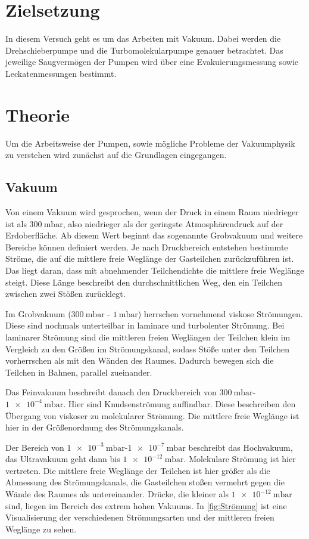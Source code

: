 \section{Zielsetzung}
    In diesem Versuch geht es um das Arbeiten mit Vakuum.
    Dabei werden die Drehschieberpumpe und die Turbomolekularpumpe genauer betrachtet.
    Das jeweilige Saugvermögen der Pumpen wird über eine Evakuierungsmessung sowie Leckatenmessungen bestimmt.

\section{Theorie}
\label{sec:Theorie}
    Um die Arbeitsweise der Pumpen, sowie mögliche Probleme der Vakuumphysik zu verstehen wird zunächst auf die Grundlagen eingegangen.
    \subsection{Vakuum}
        Von einem Vakuum wird gesprochen, wenn der Druck in einem Raum niedrieger ist als $\SI{300}{\milli\bar}$, also niedrieger als der geringste Atmosphärendruck auf der Erdoberfläche.
        Ab diesem Wert beginnt das sogenannte Grobvakuum und weitere Bereiche können definiert werden.
        Je nach Druckbereich entstehen bestimmte Ströme, die auf die mittlere freie Weglänge der Gasteilchen zurückzuführen ist.
        Das liegt daran, dass mit abnehmender Teilchendichte die mittlere freie Weglänge steigt.
        Diese Länge beschreibt den durchschnittlichen Weg, den ein Teilchen zwischen zwei Stößen zurücklegt. 

        \noindent
        Im Grobvakuum ($\SI{300}{\milli\bar}$ - $\SI{1}{\milli\bar}$) herrschen vornehmend viskose Strömungen.
        Diese sind nochmals unterteilbar in laminare und turbolenter Strömung.
        Bei laminarer Strömung sind die mittleren freien Weglängen der Teilchen klein im Vergleich zu den Größen im Strömungskanal, sodass Stöße unter den Teilchen vorherrschen als mit den Wänden des Raumes.
        Dadurch bewegen sich die Teilchen in Bahnen, parallel zueinander.

        \noindent
        Das Feinvakuum beschreibt danach den Druckbereich von $\SI{300}{\milli\bar}$-$\SI{1e-4}{\milli\bar}$.
        Hier sind Knudsenströmung auffindbar.
        Diese beschreiben den Übergang von viskoser zu molekularer Strömung.
        Die mittlere freie Weglänge ist hier in der Größenordnung des Strömungskanals.

        \noindent
        Der Bereich von $\SI{1e-3}{\milli\bar}$-$\SI{1e-7}{\milli\bar}$ beschreibt das Hochvakuum, das Ultravakuum geht dann bis $\SI{1e-12}{\milli\bar}$.
        Molekulare Strömung ist hier vertreten.
        Die mittlere freie Weglänge der Teilchen ist hier größer als die Abmessung des Strömungskanals, die Gasteilchen stoßen vermehrt gegen die Wände des Raumes als untereinander.
        \noindent
        Drücke, die kleiner als $\SI{1e-12}{\milli\bar}$ sind, liegen im Bereich des extrem hohen Vakuums.
        \noindent
        In \autoref{fig:Strömung} ist eine Visualisierung der verschiedenen Strömungsarten und der mittleren freien Weglänge zu sehen.

